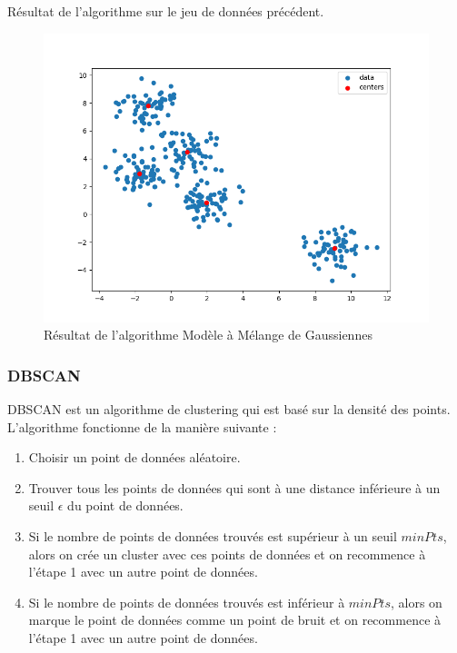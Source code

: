 \documentclass[french,a4paper,18pt]{article}
\begin{document}
Résultat de l'algorithme sur le jeu de données précédent.
\begin{figure}[h!]
    \centering
    \includegraphics[scale=0.3]{images/short_simulation_gmm.png}
    \caption{Résultat de l'algorithme Modèle à Mélange de Gaussiennes}\label{fig:short_simulation_gmm}
\end{figure}

\subsubsection{DBSCAN}

DBSCAN est un algorithme de clustering qui est basé sur la densité des points. 
L'algorithme fonctionne de la manière suivante :
\begin{enumerate}
    \item Choisir un point de données aléatoire.
    \item Trouver tous les points de données qui sont à une distance inférieure à un seuil $\epsilon$ du point de données.
    \item Si le nombre de points de données trouvés est supérieur à un seuil $minPts$, alors on crée un cluster avec ces points de données et on recommence à l'étape 1 avec un autre point de données.
    \item Si le nombre de points de données trouvés est inférieur à $minPts$, alors on marque le point de données comme un point de bruit et on recommence à l'étape 1 avec un autre point de données.
\end{enumerate}
\end{document}
